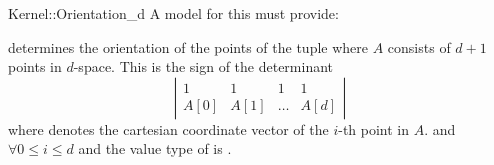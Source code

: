 \begin{ccRefFunctionObjectConcept}{Kernel::Orientation_d}
A model for this must provide:


{determines the orientation of the points of the tuple
 \ccc{A = tuple [first,last)} where $A$ consists of $d + 1$ points in
 $d$-space. This is the sign of the determinant
  \[ \left| \begin{array}{cccc}
  1 & 1 & 1 & 1 \\
  A[0] & A[1] & \dots & A[d]
  \end{array}  \right|  \]
  where  denotes the cartesian coordinate vector of
  the $i$-th point in $A$.
  \ccPrecond \ccc{size [first,last) == d+1} and
   $\forall 0 \leq i \leq d$
  and the value type of  is .
}

\end{ccRefFunctionObjectConcept}
